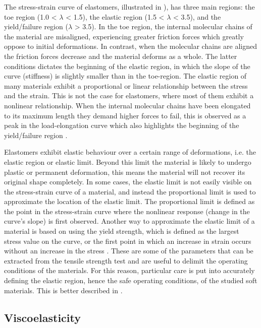 The stress-strain curve of elastomers, illustrated in  ), has three main regions: the toe region (1.0 < $\lambda$ < 1.5), the elastic region (1.5 < $\lambda$ < 3.5), and the yield/failure region ($\lambda$ > 3.5). In the toe region, the internal molecular chains of the material are misaligned, experiencing greater friction forces which greatly oppose to initial deformations. In contrast, when the molecular chains are aligned the friction forces decrease and the material deforms as a whole. The latter conditions dictates the beginning of the elastic region, in which the slope of the curve (stiffness) is slightly smaller than in the toe-region. The elastic region of many materials exhibit a proportional or linear relationship between the stress and the strain. This is not the case for elastomers, where most of them exhibit a nonlinear relationship. When the internal molecular chains have been elongated to its maximum length they demand higher forces to fail, this is observed as a peak in the load-elongation curve which also highlights the beginning of the yield/failure region \cite{Bauman2008}.

Elastomers exhibit elastic behaviour over a certain range of deformations, i.e. the elastic region or elastic limit. Beyond this limit the material is likely to undergo plastic or permanent deformation, this means the material will not recover its original shape completely. In some cases, the elastic limit is not easily visible on the stress-strain curve of a material, and instead the proportional limit is used to approximate the location of the elastic limit. The proportional limit is defined as the point in the stress-strain curve where the nonlinear response (change in the curve's slope) is first observed. Another way to approximate the elastic limit of a material is based on using the yield strength, which is defined as the largest stress value on the curve, or the first point in which an increase in strain occurs without an increase in the stress \cite{ebewele2000}. These are some of the parameters that can be extracted from the tensile strength test and are useful to delimit the operating conditions of the materials. For this reason, particular care is put into accurately defining the elastic region, hence the safe operating conditions, of the studied soft materials. This is better described in .

\subsection{Viscoelasticity}

